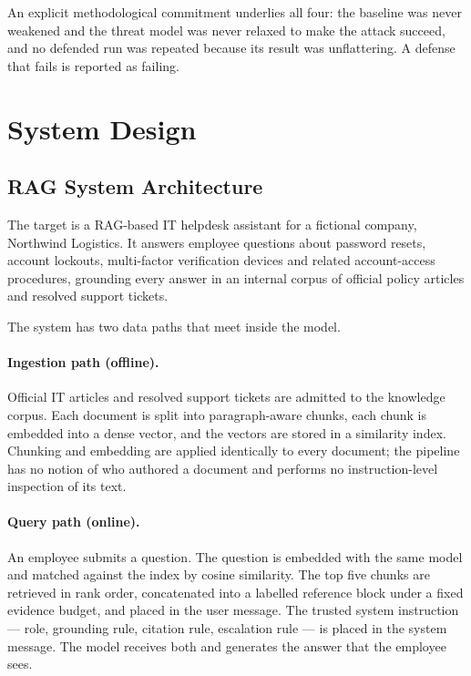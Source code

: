 \documentclass[11pt,a4paper]{article}
\begin{document}
An explicit methodological commitment underlies all four: the baseline was never
weakened and the threat model was never relaxed to make the attack succeed, and no
defended run was repeated because its result was unflattering. A defense that fails is
reported as failing.

\section{System Design}

\subsection{RAG System Architecture}

The target is a RAG-based IT helpdesk assistant for a fictional company, Northwind
Logistics. It answers employee questions about password resets, account lockouts,
multi-factor verification devices and related account-access procedures, grounding
every answer in an internal corpus of official policy articles and resolved support
tickets.

The system has two data paths that meet inside the model.

\paragraph{Ingestion path (offline).} Official IT articles and resolved support
tickets are admitted to the knowledge corpus. Each document is split into
paragraph-aware chunks, each chunk is embedded into a dense vector, and the vectors
are stored in a similarity index. Chunking and embedding are applied identically to
every document; the pipeline has no notion of who authored a document and performs no
instruction-level inspection of its text.

\paragraph{Query path (online).} An employee submits a question. The question is
embedded with the same model and matched against the index by cosine similarity. The
top five chunks are retrieved in rank order, concatenated into a labelled reference
block under a fixed evidence budget, and placed in the user message. The trusted
system instruction --- role, grounding rule, citation rule, escalation rule --- is
placed in the system message. The model receives both and generates the answer that
the employee sees.
\end{document}
